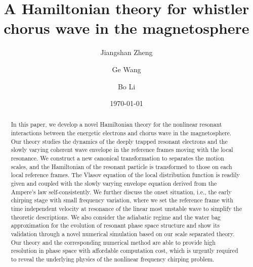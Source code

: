 \documentclass[showkeys,preprint]{revtex4-2}
\begin{document}
\title{A Hamiltonian theory for whistler chorus wave in the magnetosphere}
\author{Jiangshan Zheng}
\author{Ge Wang}
\author{Bo Li}
\date{\today}
\begin{abstract}
In this paper, we develop a novel Hamiltonian theory for the nonlinear resonant interactions between the energetic electrons and chorus wave in the magnetosphere.
Our theory studies the dynamics of the deeply trapped resonant electrons and the slowly varying coherent wave envelope in the reference frames moving with the local resonance.
We construct a new canonical transformation to separates the motion scales, and the Hamiltonian of the resonant particle is transformed to those on each local reference frames.
The Vlasov equation of the local distribution function is readily given and coupled with the slowly varying envelope equation derived from the Ampere's law self-consistently.
We further discuss the onset situation, i.e., the early chirping stage with small frequency variation, where we set the reference frame with time independent velocity at resonance of the linear most unstable wave to simplify the theoretic descriptions. 
We also consider the adiabatic regime and the water bag approximation for the evolution of resonant phase space structure and show its validation through a novel numerical simulation based on our scale separated theory.
Our theory and the corresponding numerical method are able to provide high resolution in phase space with affordable computation cost, which is urgently required to reveal the underlying physics of the nonlinear frequency chirping problem.
\end{abstract}
\maketitle









%

\end{document}
